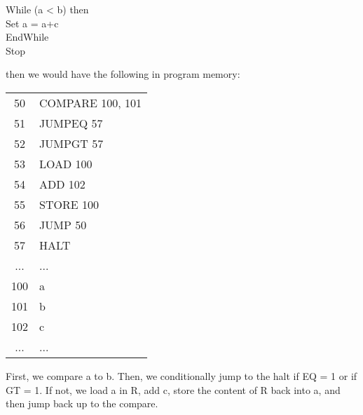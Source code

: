 \documentclass[]{article}
\begin{document}
\setlength{\parindent}{0.5cm}\noindent
While (a < b) then\\
\indent Set a = a+c\\
EndWhile\\
Stop
\setlength{\parindent}{0pt}

then we would have the following in program memory: \\

\begin{center}
	\begin{tabular}{c|l|}\cline{2-2}
		50 & COMPARE 100, 101 \\\cline{2-2}
		51 & JUMPEQ 57 \\\cline{2-2}
		52 & JUMPGT 57  \\\cline{2-2}
		53 & LOAD 100 \\\cline{2-2}
		54 & ADD 102 \\\cline{2-2}
		55 & STORE 100 \\\cline{2-2}
		56 & JUMP 50 \\\cline{2-2}
		57 & HALT \\\cline{2-2}
		... & ... \\\cline{2-2}
		100 & a \\\cline{2-2}
		101 & b \\\cline{2-2}
		102 & c \\\cline{2-2}
		... & ... \\\cline{2-2}
	\end{tabular}
	\bigbreak
\end{center}

First, we compare a to b. Then, we conditionally jump to the halt if EQ = 1 or if GT = 1. If not, we load a in R, add c, store the content of R back into a, and then jump back up to the compare. \\
\end{document}
